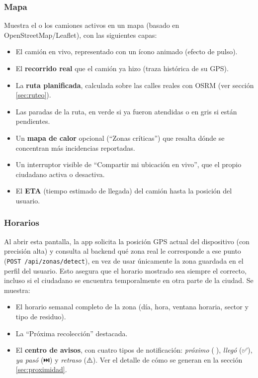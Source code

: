 \documentclass[11pt,a4paper]{article}
\begin{document}
\subsubsection{Mapa}
Muestra el o los camiones activos en un mapa (basado en OpenStreetMap/Leaflet), con las siguientes capas:
\begin{itemize}
    \item El camión en vivo, representado con un ícono animado (efecto de pulso).
    \item El \textbf{recorrido real} que el camión ya hizo (traza histórica de su GPS).
    \item La \textbf{ruta planificada}, calculada sobre las calles reales con OSRM (ver sección \ref{sec:ruteo}).
    \item Las paradas de la ruta, en verde si ya fueron atendidas o en gris si están pendientes.
    \item Un \textbf{mapa de calor} opcional (``Zonas críticas'') que resalta dónde se concentran más incidencias reportadas.
    \item Un interruptor visible de ``Compartir mi ubicación en vivo'', que el propio ciudadano activa o desactiva.
    \item El \textbf{ETA} (tiempo estimado de llegada) del camión hasta la posición del usuario.
\end{itemize}

\subsubsection{Horarios}
Al abrir esta pantalla, la app solicita la posición GPS actual del dispositivo (con precisión alta) y consulta al backend qué zona real le corresponde a ese punto (\texttt{POST /api/zonas/detect}), en vez de usar únicamente la zona guardada en el perfil del usuario. Esto asegura que el horario mostrado sea siempre el correcto, incluso si el ciudadano se encuentra temporalmente en otra parte de la ciudad. Se muestra:
\begin{itemize}
    \item El horario semanal completo de la zona (día, hora, ventana horaria, sector y tipo de residuo).
    \item La ``Próxima recolección'' destacada.
    \item El \textbf{centro de avisos}, con cuatro tipos de notificación: \emph{próximo} (🔔), \emph{llegó} (✅), \emph{ya pasó} (⏭️) y \emph{retraso} (⚠️). Ver el detalle de cómo se generan en la sección \ref{sec:proximidad}.
\end{itemize}
\end{document}
